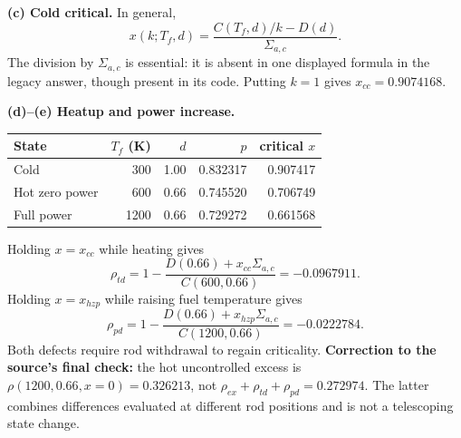 \begin{adaptedsolution}
\textbf{(c) Cold critical.} In general,
\[
\boxed{x(k;T_f,d)=\frac{C(T_f,d)/k-D(d)}{\Sigma_{a,c}}}.
\]
The division by $\Sigma_{a,c}$ is essential: it is absent in one displayed
formula in the legacy answer, though present in its code.
Putting $k=1$ gives $\boxed{x_{cc}=0.9074168}$.

\textbf{(d)--(e) Heatup and power increase.}
\begin{center}
\begin{tabular}{lrrrr}
\toprule
State & $T_f$ (K)&$d$&$p$&critical $x$\\\midrule
Cold &300&1.00&0.832317&0.907417\\
Hot zero power &600&0.66&0.745520&0.706749\\
Full power &1200&0.66&0.729272&0.661568\\\bottomrule
\end{tabular}
\end{center}
Holding $x=x_{cc}$ while heating gives
\[
\boxed{\rho_{td}=1-\frac{D(0.66)+x_{cc}\Sigma_{a,c}}{C(600,0.66)}
=-0.0967911}.
\]
Holding $x=x_{hzp}$ while raising fuel temperature gives
\[
\boxed{\rho_{pd}=1-\frac{D(0.66)+x_{hzp}\Sigma_{a,c}}{C(1200,0.66)}
=-0.0222784}.
\]
Both defects require rod withdrawal to regain criticality.
\textbf{Correction to the source's final check:} the hot uncontrolled excess
is $\rho(1200,0.66,x=0)=\boxed{0.326213}$, not
$\rho_{ex}+\rho_{td}+\rho_{pd}=0.272974$. The latter combines differences
evaluated at different rod positions and is not a telescoping state change.

\end{adaptedsolution}
